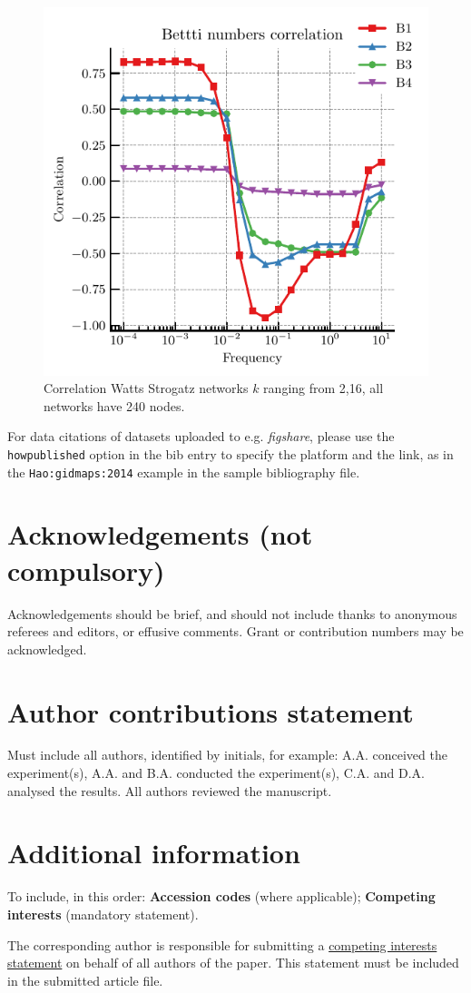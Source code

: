 \documentclass[fleqn,10pt]{wlscirep}
\begin{document}
\begin{figure}[H]
    \includegraphics[width=0.8\linewidth]{fig/betti_correlation}
    \caption{Correlation Watts Strogatz networks  $k$ ranging from 2,16, all networks have 240 nodes.}
    \label{ws_betti_correlation}
\end{figure}




For data citations of datasets uploaded to e.g. \emph{figshare}, please use the \verb|howpublished| option in the bib entry to specify the platform and the link, as in the \verb|Hao:gidmaps:2014| example in the sample bibliography file.

\section*{Acknowledgements (not compulsory)}

Acknowledgements should be brief, and should not include thanks to anonymous referees and editors, or effusive comments. Grant or contribution numbers may be acknowledged.

\section*{Author contributions statement}

Must include all authors, identified by initials, for example:
A.A. conceived the experiment(s),  A.A. and B.A. conducted the experiment(s), C.A. and D.A. analysed the results.  All authors reviewed the manuscript. 

\section*{Additional information}

To include, in this order: \textbf{Accession codes} (where applicable); \textbf{Competing interests} (mandatory statement). 

The corresponding author is responsible for submitting a \href{http://www.nature.com/srep/policies/index.html#competing}{competing interests statement} on behalf of all authors of the paper. This statement must be included in the submitted article file.
\end{document}
